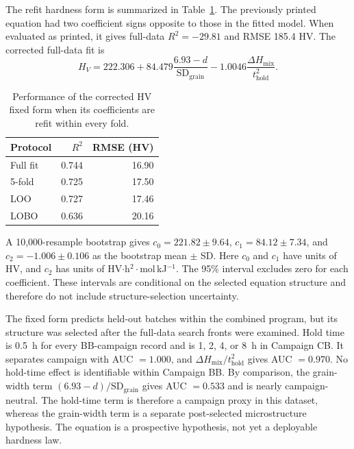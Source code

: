 \documentclass[a4paper,11pt]{article}
\begin{document}
The refit hardness form is summarized in Table~\ref{tab:hvfixed}. The previously printed equation had two coefficient signs opposite to those in the fitted model. When evaluated as printed, it gives full-data $R^2=-29.81$ and RMSE 185.4 HV. The corrected full-data fit is
\begin{equation}
H_V=222.306+84.479\frac{6.93-d}{\mathrm{SD}_{\mathrm{grain}}}
-1.0046\frac{\Delta H_{\mathrm{mix}}}{t_{\mathrm{hold}}^2}.
\end{equation}

\begin{table}[H]
\centering
\caption{Performance of the corrected HV fixed form when its coefficients are refit within every fold.}
\label{tab:hvfixed}
\begin{tabular}{lrr}
\toprule
Protocol & $R^2$ & RMSE (HV) \\
\midrule
Full fit & 0.744 & 16.90 \\
5-fold & 0.725 & 17.50 \\
LOO & 0.727 & 17.46 \\
LOBO & 0.636 & 20.16 \\
\bottomrule
\end{tabular}
\end{table}

A 10,000-resample bootstrap gives $c_0=221.82\pm9.64$, $c_1=84.12\pm7.34$, and $c_2=-1.006\pm0.106$ as the bootstrap mean $\pm$ SD. Here $c_0$ and $c_1$ have units of HV, and $c_2$ has units of HV$\cdot$h$^2\cdot$mol\,kJ$^{-1}$. The 95\% interval excludes zero for each coefficient. These intervals are conditional on the selected equation structure and therefore do not include structure-selection uncertainty.

The fixed form predicts held-out batches within the combined program, but its structure was selected after the full-data search fronts were examined. Hold time is 0.5~h for every BB-campaign record and is 1, 2, 4, or 8~h in Campaign CB. It separates campaign with AUC $=1.000$, and $\Delta H_{\mathrm{mix}}/t_{\mathrm{hold}}^2$ gives AUC $=0.970$. No hold-time effect is identifiable within Campaign BB. By comparison, the grain-width term $(6.93-d)/\mathrm{SD}_{\mathrm{grain}}$ gives AUC $=0.533$ and is nearly campaign-neutral. The hold-time term is therefore a campaign proxy in this dataset, whereas the grain-width term is a separate post-selected microstructure hypothesis. The equation is a prospective hypothesis, not yet a deployable hardness law.
\end{document}
